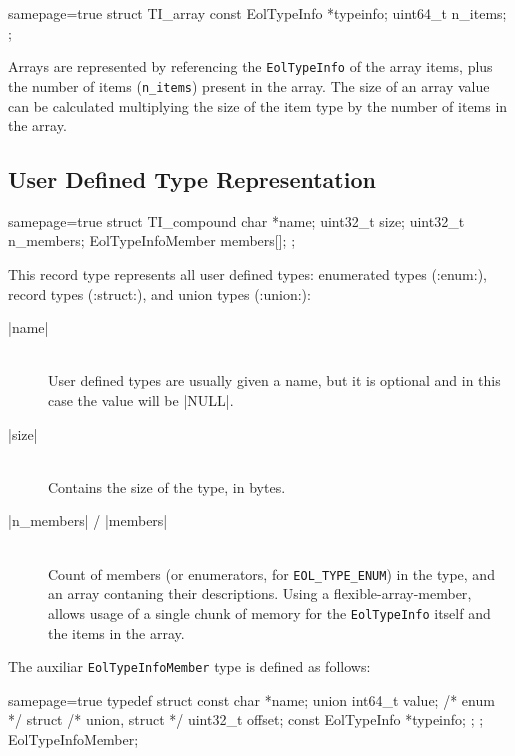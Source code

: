 \begin{ccode*}{samepage=true}
  struct TI_array {
    const EolTypeInfo *typeinfo;
    uint64_t           n_items;
  };
\end{ccode*}

\noindent
Arrays are represented by referencing the \verb|EolTypeInfo| of the array
items, plus the number of items (\verb|n_items|) present in the array. The
size of an array value can be calculated multiplying the size of the item type
by the number of items in the array.


\subsection{User Defined Type Representation}

\begin{ccode*}{samepage=true}
  struct TI_compound {
    char             *name;
    uint32_t          size;
    uint32_t          n_members;
    EolTypeInfoMember members[];
  };
\end{ccode*}

\noindent This record type represents all user defined types: enumerated types
(\Mc:enum:), record types (\Mc:struct:), and union types (\Mc:union:):

\begin{description}
  \item [\Mc|name|] \hfill \\
    User defined types are usually given a name, but it is optional and in
    this case the value will be \Mc|NULL|.
  \item [\Mc|size|] \hfill \\
    Contains the size of the type, in bytes.
  \item [\Mc|n_members| / \Mc|members|] \hfill \\
    Count of members (or enumerators, for \verb|EOL_TYPE_ENUM|) in the type,
    and an array contaning their descriptions. Using
    a \gls{flexible-array-member}, allows usage of a single chunk of memory
    for the \verb|EolTypeInfo| itself and the items in the array.
\end{description}

\noindent
The auxiliar \verb|EolTypeInfoMember| type is defined as follows:

\begin{ccode*}{samepage=true}
  typedef struct {
    const char            *name;
    union {
      int64_t              value; /* enum */
      struct {                    /* union, struct */
        uint32_t           offset;
        const EolTypeInfo *typeinfo;
      };
    };
  } EolTypeInfoMember;
\end{ccode*}

